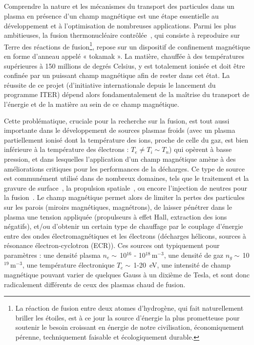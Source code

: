 
\begin{refsection}

\section*{}
Comprendre la nature et les mécanismes du transport des particules dans un
plasma en présence d'un champ magnétique est une étape essentielle au
développement et à l'optimisation de nombreuses applications.
Parmi les plus ambitieuses, la fusion thermonucléaire
contrôlée~\parencite{Wesson}, qui consiste à reproduire sur Terre des réactions
de fusion\footnote{La réaction de fusion entre deux atomes d'hydrogène, qui fait naturellement briller les
étoiles, est à ce jour la source d'énergie la plus prometteuse pour soutenir le besoin croissant en énergie de notre civilisation,
économiquement pérenne, techniquement faisable et écologiquement durable.},
repose sur un dispositif de confinement magnétique en forme d'anneau appelé « tokamak ».
La matière, chauffée à des températures supérieures à 150 millions de degrés
Celsius, y est totalement ionisée et doit être confinée par un puissant champ magnétique afin
de rester dans cet état. La réussite de ce projet (d'initiative
internationale depuis le lancement du programme ITER) dépend alors
fondamentalement de la maîtrise du transport de l'énergie et de la matière au
sein de ce champ magnétique.

Cette problématique, cruciale pour la recherche sur la fusion, est tout aussi
importante dans le développement de sources plasmas froids (avec un plasma
partiellement ionisé dont la température des ions, proche de celle du gaz,
est bien inférieure à la température des électrons : $T_e\neq T_i\sim
T_n$) qui opèrent à basse pression, et dans lesquelles l'application d'un champ
magnétique amène à des améliorations critiques pour les performances de la
décharges. Ce type de source est communément utilisé dans de
nombreux domaines, tels que le traitement et la gravure de
surface~\parencite{Lieberman}, la propulsion spatiale~\parencite{Zhurin}, ou
encore l'injection de neutres pour la fusion~\parencite{SimoninHDR}. Le champ
magnétique permet alors de limiter la pertes des particules sur les parois (miroirs magnétiques,
magnétrons), de laisser pénétrer dans le plasma une tension appliquée
(propulseurs à effet Hall, extraction des ions négatifs), et/ou d'obtenir un
certain type de chauffage par le couplage d'énergie entre des ondes
électromagnétiques et les électrons (décharges hélicons, sources à résonance
électron-cyclotron (ECR)). Ces sources ont typiquement pour paramètres : une
densité plasma $n_e\sim\,$10$^{16}$ - 10$^{18}\,$m$^{-3}$, une densité de gaz
$n_g\sim\,$10$^{19}\,$m$^{-3}$, une température électronique $T_e\sim\,$1-20~eV,
une intensité de champ magnétique pouvant varier de quelques Gauss à un dixième
de Tesla, et sont donc radicalement différents de ceux des plasmas chaud de
fusion.


\end{refsection}

